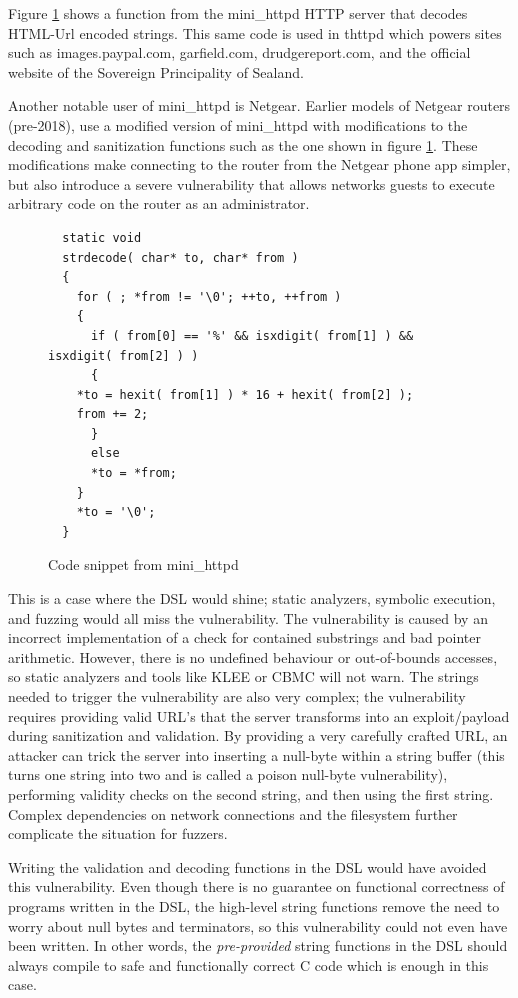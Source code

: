 \documentclass[letterpaper]{article}
\begin{document}
Figure \ref{fig:minihttpd} shows a function from the mini\_httpd
HTTP server that decodes HTML-Url encoded strings. This
same code is used in thttpd which powers sites such as
images.paypal.com, garfield.com, drudgereport.com, and
the official website of the Sovereign Principality of Sealand.

Another notable user of mini\_httpd is Netgear. Earlier
models of Netgear routers (pre-2018), use a modified version of mini\_httpd
with modifications to the decoding and sanitization functions such as
the one shown in figure \ref{fig:minihttpd}. These modifications make connecting
to the router from the Netgear phone app simpler, but also introduce a
severe vulnerability that allows networks guests to execute arbitrary code
on the router as an administrator.


\begin{figure}
\centering
\begin{lstlisting}
  static void
  strdecode( char* to, char* from )
  {
    for ( ; *from != '\0'; ++to, ++from )
    {
      if ( from[0] == '%' && isxdigit( from[1] ) && isxdigit( from[2] ) )
      {
	*to = hexit( from[1] ) * 16 + hexit( from[2] );
	from += 2;
      }
      else
      *to = *from;
    }
    *to = '\0';
  }
\end{lstlisting}
\caption{Code snippet from mini\_httpd}
\label{fig:minihttpd}
\end{figure}

This is a case where the DSL would shine; static analyzers, symbolic
execution, and fuzzing would all miss the vulnerability. The vulnerability
is caused by an incorrect implementation of a check for contained substrings
and bad pointer arithmetic. However, there is no undefined behaviour or
out-of-bounds accesses, so static analyzers and tools like KLEE or CBMC
will not warn. The strings needed to trigger the vulnerability are also
very complex; the vulnerability requires providing valid URL's that the
server transforms into an exploit/payload during sanitization and validation.
By providing a very carefully crafted URL, an attacker can trick the server
into inserting a null-byte within a string buffer (this turns one string into
two and is called a poison null-byte vulnerability), performing validity checks on the
second string, and then using the first string. Complex dependencies on
network connections and the filesystem further complicate the situation for fuzzers.

Writing the validation and decoding functions in the DSL would have avoided
this vulnerability. Even though there is no guarantee on functional correctness
of programs written in the DSL, the high-level string functions remove the
need to worry about null bytes and terminators, so this vulnerability could not
even have been written. In other words, the \textit{pre-provided} string functions in the DSL
should always compile to safe and functionally correct C code which is enough
in this case.
\end{document}
